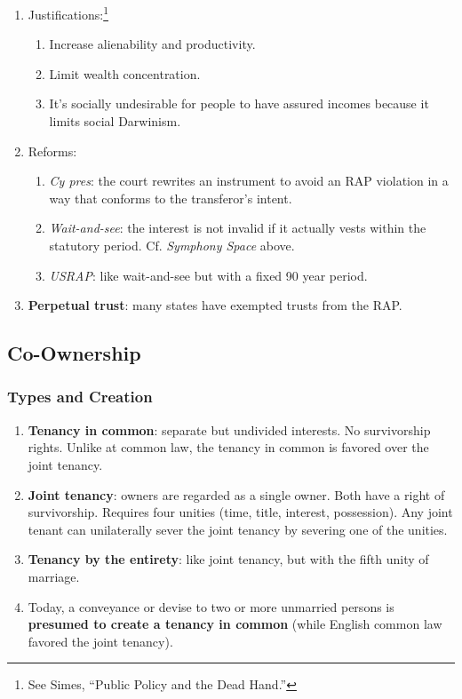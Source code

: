 \begin{enumerate}
\begin{enumerate}
\begin{enumerate}
            \item Justifications:\footnote{See Simes, ``Public Policy and the 
            Dead Hand.''}
            \begin{enumerate}
                \item Increase alienability and productivity.
                \item Limit wealth concentration.
                \item It's socially undesirable for people to have assured 
                incomes because it limits social Darwinism.
            \end{enumerate}
            \item Reforms:
            \begin{enumerate}
                \item \emph{Cy pres}: the court rewrites an instrument to 
                avoid an RAP violation in a way that conforms to the 
                transferor's intent.
                \item \emph{Wait-and-see}: the interest is not invalid if it 
                actually vests within the statutory period. Cf. \emph{Symphony 
                Space} above.
                \item \emph{USRAP}: like wait-and-see but with a fixed 90 year 
                period.
            \end{enumerate}
            \item \textbf{Perpetual trust}: many states have exempted trusts 
            from the RAP.
        \end{enumerate}
    \end{enumerate}
\end{enumerate}

\subsection{Co-Ownership}

\subsubsection{Types and Creation}

\begin{enumerate}
    \item \textbf{Tenancy in common}: separate but undivided interests. No 
    survivorship rights. Unlike at common law, the tenancy in common is 
    favored over the joint tenancy.
    \item \textbf{Joint tenancy}: owners are regarded as a single owner. Both 
    have a right of survivorship. Requires four unities (time, title, 
    interest, possession). Any joint tenant can unilaterally sever the joint 
    tenancy by severing one of the unities.
    \item \textbf{Tenancy by the entirety}: like joint tenancy, but with the 
    fifth unity of marriage.
    \item Today, a conveyance or devise to two or more unmarried persons is 
    \textbf{presumed to create a tenancy in common} (while English common law 
    favored the joint tenancy).
\end{enumerate}

